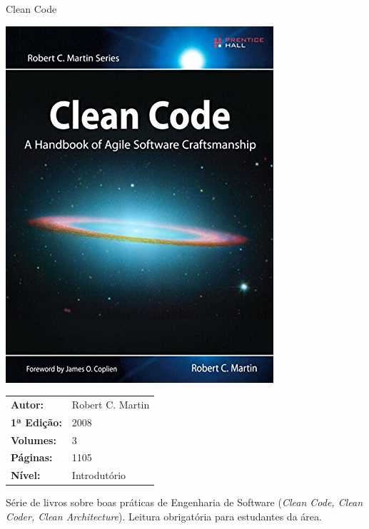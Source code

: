 \begin{frame}[fragile]{Clean Code}

    \begin{minipage}{0.4\textwidth}
        \includegraphics[scale=0.25]{martin.jpg}
    \end{minipage}
    \begin{minipage}{0.5\textwidth}
        \begin{small}
            \begin{tabularx}{0.95\textwidth}{lX}
                \textbf{Autor:} & Robert C. Martin \\
                \textbf{1ª Edição:} & 2008 \\
                \textbf{Volumes:} & 3 \\
                \textbf{Páginas:} & 1105 \\
                \textbf{Nível:} & Introdutório \\
            \end{tabularx}
        \end{small}
    \end{minipage}

    \vspace{0.2in} 

    Série de livros sobre boas práticas de Engenharia de Software (\textit{Clean Code,
    Clean Coder, Clean Architecture}). Leitura obrigatória para estudantes da área.

\end{frame}

